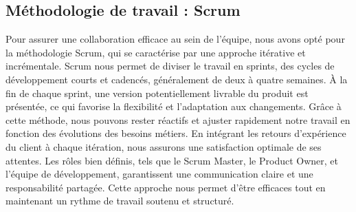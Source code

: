 \subsection{Méthodologie de travail : Scrum}

Pour assurer une collaboration efficace au sein de l'équipe, nous avons opté pour la méthodologie Scrum, qui se caractérise par une approche itérative et incrémentale. Scrum nous permet de diviser le travail en sprints, des cycles de développement courts et cadencés, généralement de deux à quatre semaines. À la fin de chaque sprint, une version potentiellement livrable du produit est présentée, ce qui favorise la flexibilité et l'adaptation aux changements. Grâce à cette méthode, nous pouvons rester réactifs et ajuster rapidement notre travail en fonction des évolutions des besoins métiers. En intégrant les retours d'expérience du client à chaque itération, nous assurons une satisfaction optimale de ses attentes. Les rôles bien définis, tels que le Scrum Master, le Product Owner, et l'équipe de développement, garantissent une communication claire et une responsabilité partagée. Cette approche nous permet d'être efficaces tout en maintenant un rythme de travail soutenu et structuré.


    
    
    
    
